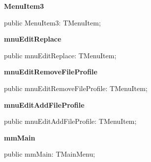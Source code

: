 \documentclass{report}
\newif\ifpdf
\begin{document}
\begin{list}{}
\begin{flushleft}
\ifpdf
\end{flushleft}
\fi


\par  \label{editor.TFrmEditor-MenuItem3}
\item[\textbf{MenuItem3}\hfill]
\ifpdf
\begin{flushleft}
\fi
\begin{ttfamily}
public MenuItem3: TMenuItem;\end{ttfamily}

\ifpdf
\end{flushleft}
\fi


\par  \label{editor.TFrmEditor-mnuEditReplace}
\item[\textbf{mnuEditReplace}\hfill]
\ifpdf
\begin{flushleft}
\fi
\begin{ttfamily}
public mnuEditReplace: TMenuItem;\end{ttfamily}

\ifpdf
\end{flushleft}
\fi


\par  \label{editor.TFrmEditor-mnuEditRemoveFileProfile}
\item[\textbf{mnuEditRemoveFileProfile}\hfill]
\ifpdf
\begin{flushleft}
\fi
\begin{ttfamily}
public mnuEditRemoveFileProfile: TMenuItem;\end{ttfamily}

\ifpdf
\end{flushleft}
\fi


\par  \label{editor.TFrmEditor-mnuEditAddFileProfile}
\item[\textbf{mnuEditAddFileProfile}\hfill]
\ifpdf
\begin{flushleft}
\fi
\begin{ttfamily}
public mnuEditAddFileProfile: TMenuItem;\end{ttfamily}

\ifpdf
\end{flushleft}
\fi


\par  \label{editor.TFrmEditor-mmMain}
\item[\textbf{mmMain}\hfill]
\ifpdf
\begin{flushleft}
\fi
\begin{ttfamily}
public mmMain: TMainMenu;\end{ttfamily}


\end{flushleft}
\end{list}
\end{document}
